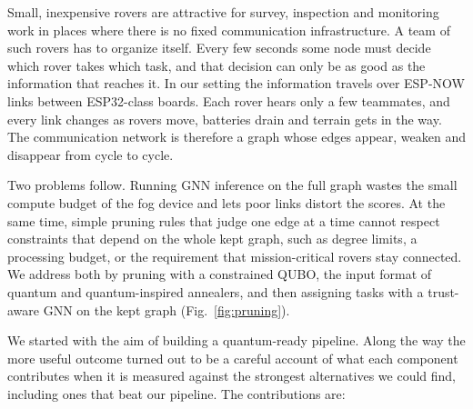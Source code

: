 \documentclass[11pt]{article}
\begin{document}
Small, inexpensive rovers are attractive for survey, inspection and
monitoring work in places where there is no fixed communication
infrastructure. A team of such rovers has to organize itself. Every few
seconds some node must decide which rover takes which task, and that decision
can only be as good as the information that reaches it. In our setting the
information travels over ESP-NOW links between ESP32-class boards. Each rover
hears only a few teammates, and every link changes as rovers move, batteries
drain and terrain gets in the way. The communication network is therefore a
graph whose edges appear, weaken and disappear from cycle to cycle.

Two problems follow. Running GNN inference on the full graph wastes the small
compute budget of the fog device and lets poor links distort the scores. At
the same time, simple pruning rules that judge one edge at a time cannot
respect constraints that depend on the whole kept graph, such as degree
limits, a processing budget, or the requirement that mission-critical rovers
stay connected. We address both by pruning with a constrained QUBO, the input
format of quantum and quantum-inspired annealers, and then assigning tasks
with a trust-aware GNN on the kept graph (Fig.~\ref{fig:pruning}).

We started with the aim of building a quantum-ready pipeline. Along the way
the more useful outcome turned out to be a careful account of what each
component contributes when it is measured against the strongest alternatives
we could find, including ones that beat our pipeline. The contributions are:
\end{document}
